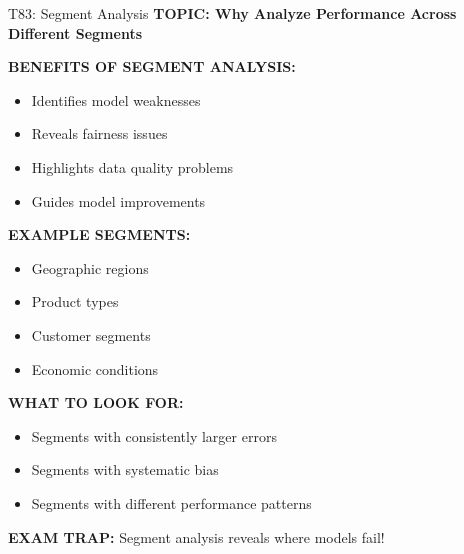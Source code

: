 \documentclass[8pt]{beamer}
\begin{document}
	\begin{frame}{T83: Segment Analysis}
		\fontsize{6.5}{7.5}\selectfont
		\textbf{TOPIC: Why Analyze Performance Across Different Segments}
		
		\vspace{0.1cm}
		\textbf{BENEFITS OF SEGMENT ANALYSIS:}
		\begin{itemize}
			\item Identifies model weaknesses
			\item Reveals fairness issues
			\item Highlights data quality problems
			\item Guides model improvements
		\end{itemize}
		
		\vspace{0.1cm}
		\textbf{EXAMPLE SEGMENTS:}
		\begin{itemize}
			\item Geographic regions
			\item Product types
			\item Customer segments
			\item Economic conditions
		\end{itemize}
		
		\vspace{0.1cm}
		\textbf{WHAT TO LOOK FOR:}
		\begin{itemize}
			\item Segments with consistently larger errors
			\item Segments with systematic bias
			\item Segments with different performance patterns
		\end{itemize}
		
		\textcolor{myred}{\textbf{EXAM TRAP:}} Segment analysis reveals \textcolor{myblue}{where models fail}!
	\end{frame}
	
\end{document}
